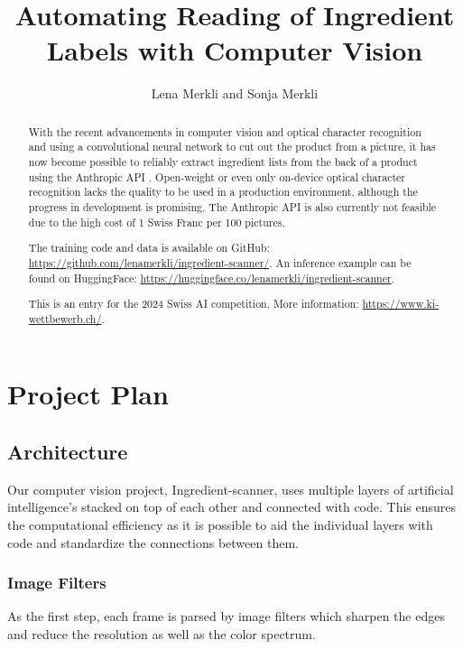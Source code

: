 \documentclass[a4paper,11pt]{report}
\title{Automating Reading of Ingredient Labels with Computer Vision}
\author{Lena Merkli and Sonja Merkli}
\begin{document}
    \maketitle
    
    \begin{abstract}
        With the recent advancements in computer vision and optical character recognition and using a convolutional neural network \cite{he2015deepresiduallearningimage} to cut out the product from a picture, it has now become possible to reliably extract ingredient lists from the back of a product using the Anthropic API \cite{claude3-5sonnet}. Open-weight or even only on-device optical character recognition lacks the quality to be used in a production environment, although the progress in development is promising. The Anthropic API is also currently not feasible due to the high cost of 1 Swiss Franc per 100 pictures.
        
        The training code and data is available on GitHub: \url{https://github.com/lenamerkli/ingredient-scanner/}. An inference example can be found on HuggingFace: \url{https://huggingface.co/lenamerkli/ingredient-scanner}.
        
        This is an entry for the 2024 Swiss AI competition. More information: \url{https://www.ki-wettbewerb.ch/}.
    \end{abstract}
    
    \tableofcontents

    \chapter{Project Plan}

        \section{Architecture}
                Our computer vision project, Ingredient-scanner, uses multiple layers of artificial intelligence's stacked on top of each other and connected with code. This ensures the computational efficiency as it is possible to aid the individual layers with code and standardize the connections between them.

            \subsection{Image Filters}
                \label{subsec:architecture:filters}
                As the first step, each frame is parsed by image filters which sharpen the edges and reduce the resolution as well as the color spectrum.
\end{document}
